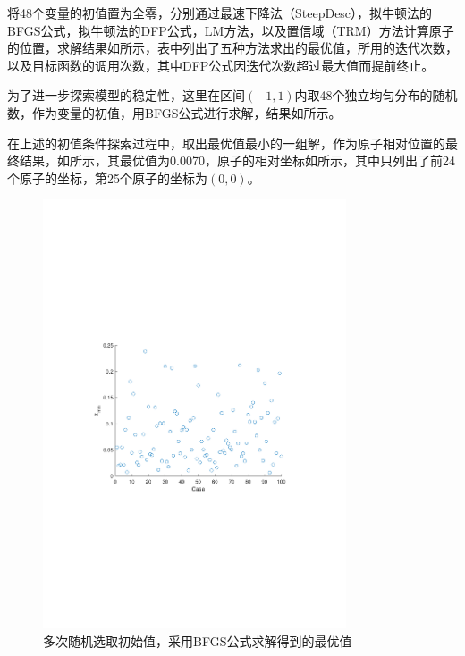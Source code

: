 \documentclass[12pt,a4paper]{article}
\begin{document}
将48个变量的初值置为全零，分别通过最速下降法（SteepDesc），拟牛顿法的BFGS公式，拟牛顿法的DFP公式，LM方法，以及置信域（TRM）方法计算原子的位置，求解结果如所示，表中列出了五种方法求出的最优值，所用的迭代次数，以及目标函数的调用次数，其中DFP公式因迭代次数超过最大值而提前终止。

为了进一步探索模型的稳定性，这里在区间$(-1, 1)$内取48个独立均匀分布的随机数，作为变量的初值，用BFGS公式进行求解，结果如所示。

在上述的初值条件探索过程中，取出最优值最小的一组解，作为原子相对位置的最终结果，如所示，其最优值为0.0070，原子的相对坐标如所示，其中只列出了前24个原子的坐标，第25个原子的坐标为$(0,0)$。

\begin{figure}[t]
    \centering
    \includegraphics[width=0.8\textwidth,trim={3.09cm 9.295cm 3.09cm 9.295cm},clip]{fig/ex5_zmin.pdf}
    \caption{多次随机选取初始值，采用BFGS公式求解得到的最优值}
    \label{fig:ex5_zmin}
\end{figure}
\end{document}
